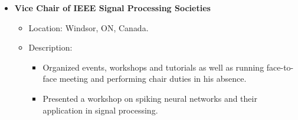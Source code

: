 \begin {itemize}
\begin {itemize}
            \begin {itemize}
                \item [-]   {   Description:} 
                    \begin {itemize}
                        \item [\textbullet] Assigned reviewers to papers and follow up regarding reviews
                         \item [\textbullet] Preliminary decision on papers based on reviewer comments
                    \end {itemize}
                        \item [-]   {   Journals and Conferences:} 
                    \begin {itemize}   
                        \item [\textbullet] IEEE International Symposium on Circuits and Systems (ISCAS) 2024 
                        \item [\textbullet] IEEE International Symposium on Circuits and Systems (ISCAS) 2023
                    \end {itemize}
            \end {itemize} \vspace{0.3cm}
     \item [$\bullet$] \bf {\mtf \normalsize  Vice Chair of IEEE Signal Processing Societies} \mdseries
            \begin {itemize}
                \item [-]  {  Location: Windsor, ON, Canada.}
                \item [-]   {   Description:} 
                    \begin {itemize}
                        \item [\textbullet]  Organized events, workshops and tutorials  as well as running  face-to-face meeting and performing chair duties in his absence.
                        \item [\textbullet] Presented a workshop on spiking neural networks and their application in signal processing. 
                    \end {itemize}
            \end {itemize} \vspace{0.3cm}         
    \end {itemize}
\end {itemize}















